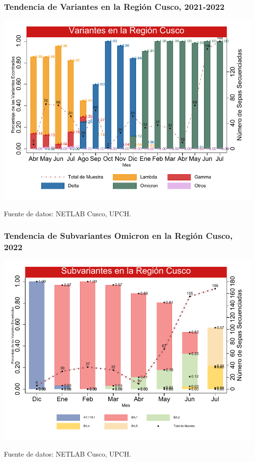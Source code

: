 \documentclass[xcolor=table]{beamer}
\begin{document}
\begin{frame}[label=variantes]
\frametitle{Tendencia de Variantes en la Región Cusco, 2021-2022}
\vspace{-.5cm}
\begin{center}
\includegraphics[width=0.9\linewidth]{../figuras/variantes.pdf}
\end{center}
{\tiny Fuente de datos: NETLAB Cusco, UPCH.}
\end{frame}

\begin{frame}[label=subvariantes]
	\frametitle{Tendencia de Subvariantes Omicron en la Región Cusco, 2022}
	\vspace{-.5cm}
	\begin{center}
		\includegraphics[width=0.85\linewidth]{../figuras/subvariantes.pdf}
	\end{center}
	{\tiny Fuente de datos: NETLAB Cusco, UPCH.}
\end{frame}
\end{document}
